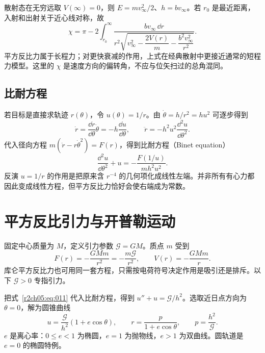 散射态在无穷远取 $V(\infty)=0$，则 $E=mv_\infty^2/2$、$h=bv_\infty$。若 $r_0$ 是最近距离，入射和出射关于近心线对称，故
\begin{equation}
 \chi=\pi-2\int_{r_0}^{\infty}
 \frac{bv_\infty\,\dd r}
 {r^2\sqrt{v_\infty^2-\dfrac{2V(r)}m-\dfrac{b^2v_\infty^2}{r^2}}}.
 \label{r2ch05:eq:009}
\end{equation}
平方反比力属于长程力；对更快衰减的作用，上式在经典散射中更接近通常的短程力模型。这里的 $\chi$ 是速度方向的偏转角，不应与位矢扫过的总角混同。

\subsection{比耐方程}
\label{r2ch05:sec:binet}

若目标是直接求轨迹 $r(\theta)$，令 $u(\theta)=1/r$。由 $\dot\theta=h/r^2=hu^2$ 可逐步得到
\[
 \dot r=\frac{\dd r}{\dd\theta}\dot\theta=-h\frac{\dd u}{\dd\theta},
 \qquad
 \ddot r=-h^2u^2\frac{\dd^2u}{\dd\theta^2}.
\]
代入径向方程 $m(\ddot r-r\dot\theta^2)=F(r)$，得到比耐方程（Binet equation）
\begin{equation}
 \frac{\dd^2u}{\dd\theta^2}+u
 =-\frac{F(1/u)}{mh^2u^2}.
 \label{r2ch05:eq:010}
\end{equation}
反演 $u=1/r$ 的作用是把原来含 $r^{-4}$ 的几何项化成线性左端。并非所有有心力都因此变成线性方程，但平方反比力恰好会使右端成为常数。

\section{平方反比引力与开普勒运动}
\label{r2ch05:sec:kepler}

固定中心质量为 $M$，定义引力参数 $\mathcal G=GM$。质点 $m$ 受到
\begin{equation}
 F(r)=-\frac{GMm}{r^2}=-\frac{m\mathcal G}{r^2},\qquad
 V(r)=-\frac{GMm}{r}.
 \label{r2ch05:eq:011}
\end{equation}
库仑平方反比力也可用同一套方程，只需按电荷符号决定作用是吸引还是排斥。以下 $\mathcal G>0$ 专指引力。

把式~\eqref{r2ch05:eq:011} 代入比耐方程，得到 $u''+u=\mathcal G/h^2$。选取近日点方向为 $\theta=0$，解为圆锥曲线
\begin{equation}
 u=\frac{\mathcal G}{h^2}(1+e\cos\theta),\qquad
 r=\frac{p}{1+e\cos\theta},\qquad
 p=\frac{h^2}{\mathcal G}.
 \label{r2ch05:eq:012}
\end{equation}
$e$ 是离心率：$0\le e<1$ 为椭圆，$e=1$ 为抛物线，$e>1$ 为双曲线。圆轨道是 $e=0$ 的椭圆特例。

